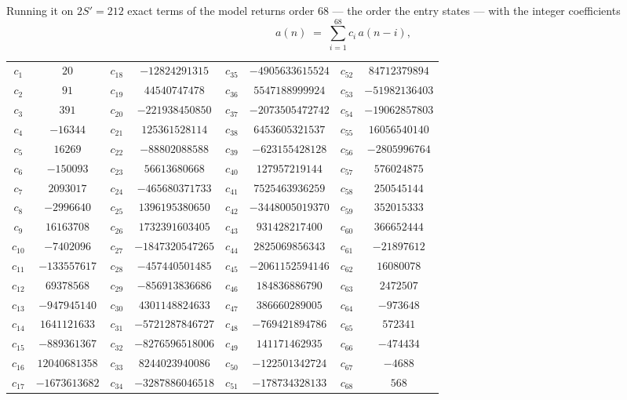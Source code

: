 \documentclass[11pt,a4paper]{article}
\theoremstyle{plain}
\theoremstyle{definition}
\begin{document}
Running it on $2S'=212$ exact terms of the model returns order $68$ --- the order the
entry states --- with the integer coefficients
\[
a(n)\;=\;\sum_{i=1}^{68}c_i\,a(n-i),
\]
\begin{center}\small
\begin{tabular}{cccccccc}
$c_{1}$ & $20$ & $c_{18}$ & $-12824291315$ & $c_{35}$ & $-4905633615524$ & $c_{52}$ & $84712379894$ \\
$c_{2}$ & $91$ & $c_{19}$ & $44540747478$ & $c_{36}$ & $5547188999924$ & $c_{53}$ & $-51982136403$ \\
$c_{3}$ & $391$ & $c_{20}$ & $-221938450850$ & $c_{37}$ & $-2073505472742$ & $c_{54}$ & $-19062857803$ \\
$c_{4}$ & $-16344$ & $c_{21}$ & $125361528114$ & $c_{38}$ & $6453605321537$ & $c_{55}$ & $16056540140$ \\
$c_{5}$ & $16269$ & $c_{22}$ & $-88802088588$ & $c_{39}$ & $-623155428128$ & $c_{56}$ & $-2805996764$ \\
$c_{6}$ & $-150093$ & $c_{23}$ & $56613680668$ & $c_{40}$ & $127957219144$ & $c_{57}$ & $576024875$ \\
$c_{7}$ & $2093017$ & $c_{24}$ & $-465680371733$ & $c_{41}$ & $7525463936259$ & $c_{58}$ & $250545144$ \\
$c_{8}$ & $-2996640$ & $c_{25}$ & $1396195380650$ & $c_{42}$ & $-3448005019370$ & $c_{59}$ & $352015333$ \\
$c_{9}$ & $16163708$ & $c_{26}$ & $1732391603405$ & $c_{43}$ & $931428217400$ & $c_{60}$ & $366652444$ \\
$c_{10}$ & $-7402096$ & $c_{27}$ & $-1847320547265$ & $c_{44}$ & $2825069856343$ & $c_{61}$ & $-21897612$ \\
$c_{11}$ & $-133557617$ & $c_{28}$ & $-457440501485$ & $c_{45}$ & $-2061152594146$ & $c_{62}$ & $16080078$ \\
$c_{12}$ & $69378568$ & $c_{29}$ & $-856913836686$ & $c_{46}$ & $184836886790$ & $c_{63}$ & $2472507$ \\
$c_{13}$ & $-947945140$ & $c_{30}$ & $4301148824633$ & $c_{47}$ & $386660289005$ & $c_{64}$ & $-973648$ \\
$c_{14}$ & $1641121633$ & $c_{31}$ & $-5721287846727$ & $c_{48}$ & $-769421894786$ & $c_{65}$ & $572341$ \\
$c_{15}$ & $-889361367$ & $c_{32}$ & $-8276596518006$ & $c_{49}$ & $141171462935$ & $c_{66}$ & $-474434$ \\
$c_{16}$ & $12040681358$ & $c_{33}$ & $8244023940086$ & $c_{50}$ & $-122501342724$ & $c_{67}$ & $-4688$ \\
$c_{17}$ & $-1673613682$ & $c_{34}$ & $-3287886046518$ & $c_{51}$ & $-178734328133$ & $c_{68}$ & $568$ \\
\end{tabular}
\end{center}
\end{document}
